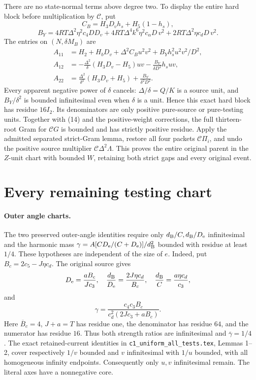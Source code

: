 There are no state-normal terms above degree two. To display the
entire hard block before multiplication by $\mathcal C$, put
\[
 C_B=H_3D_vh_s+H_5(1-h_s),
\]
\[
 B_Y=4RT\Delta^2\eta^2c_4DD_v
      +4RT\Delta^4k^6\eta^2c_\alpha D\,v^2
      +2RT\Delta^2\eta c_dD\,v^2.
\]
The entries on $(N,\delta M_B)$ are
\begin{align*}
 A_{11}&=H_2+H_bD_v+\Delta^2C_Bu^2v^2
                         +B_Yh_s^2u^2v^2/D^2,\\
 A_{12}&=-\frac{\Delta^2}{\delta}(H_3D_v-H_5)uv
                         -\frac{B_Y}{\delta D^2}h_suv,\\
 A_{22}&=\frac{\Delta^2}{\delta^2}(H_3D_v+H_5)
                         +\frac{B_Y}{\delta^2D^2}.
\end{align*}
Every apparent negative power of $\delta$ cancels: $\Delta/\delta=Q/K$
is a source unit, and $B_Y/\delta^2$ is bounded infinitesimal even
when $\delta$ is a unit. Hence this exact hard block has residue
$16I_2$. Its denominators are only positive pure-source or
pure-testing units. Together with (14) and the positive-weight
corrections, the full thirteen-root Gram for $\mathcal CG$ is bounded
and has strictly positive residue. Apply the admitted separated
strict-Gram lemma, restore all four packets $\mathcal C\Pi_i$,
and undo the positive source multiplier $\mathcal C\Delta^2\Lambda$.
This proves the entire original parent in the $Z$-unit chart with
bounded $W$, retaining both strict gaps and every original event.

\section{Every remaining testing chart}

\paragraph{Outer angle charts.}
The two preserved outer-angle identities require only
$d_{\rm B}/C,d_{\rm B}/D_{\rm e}$ infinitesimal and the harmonic
mass $\gamma=A[CD_{\rm e}/(C+D_{\rm e})]/d_{\rm B}^2$ bounded
with residue at least $1/4$. These hypotheses are independent of the
size of $e$. Indeed, put $B_c=2c_5-J\eta c_d$. The original source gives
\[
 D_{\rm e}=\frac{aB_c}{Jc_3},\quad
 \frac{d_{\rm B}}{D_{\rm e}}=\frac{2J\eta c_d}{B_c},\quad
 \frac{d_{\rm B}}C=\frac{a\eta c_d}{c_3},
\]
and
\[
 \gamma=\frac{c_4c_3B_c}{c_d^2(2Jc_3+aB_c)}.
\]
Here $\overline B_c=4$, $J+a=T$ has residue one, the denominator
has residue $64$, and the numerator has residue $16$. Thus both
strength ratios are infinitesimal and $\overline\gamma=1/4$.
The exact retained-current identities in
\texttt{c1\_uniform\_all\_tests.tex}, Lemmas 1--2, cover respectively
$1/v$ bounded and $v$ infinitesimal with $1/u$ bounded, with all
homogeneous infinity endpoints. Consequently only $u,v$
infinitesimal remain. The literal axes have a nonnegative core.

